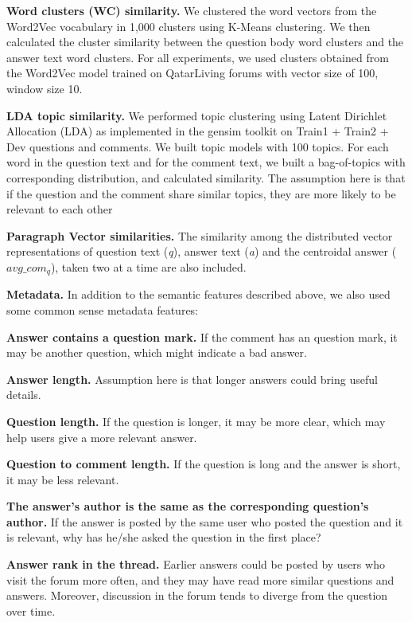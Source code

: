 \documentclass[12pt, a4paper, oneside]{Thesis} %
\begin{document}
\textbf{Word clusters (WC) similarity.} We clustered the word vectors from the Word2Vec vocabulary in 1,000 clusters using K-Means clustering. We then calculated the cluster similarity between the question body word clusters and the answer text word clusters. For all experiments, we used clusters obtained from the Word2Vec model trained on QatarLiving forums with vector size of 100, window size 10.

\textbf{LDA topic similarity.} We performed topic clustering using Latent Dirichlet Allocation (LDA) as implemented in the gensim toolkit \cite{rehurek2010software} on Train1 + Train2 + Dev questions and comments. We built topic models with 100 topics. For each word in the question text and for the comment text, we built a bag-of-topics with corresponding distribution, and calculated similarity. The assumption here is that if the question and the comment share similar topics, they are more likely to be relevant to each other

\textbf{Paragraph Vector similarities.} The similarity among the distributed vector representations of question text (\textit{q}), answer text (\textit{a}) and the centroidal answer ($avg\_com_q$), taken two at a time are also included.

\textbf{Metadata.} In addition to the semantic features described above, we also used some common sense metadata features:

\textbf{Answer contains a question mark.} If the comment has an question mark, it may be another question, which might indicate a bad answer.

\textbf{Answer length.} Assumption here is that longer answers could bring useful details.

\textbf{Question length.} If the question is longer, it may be more clear, which may help users give a more relevant answer.

\textbf{Question to comment length.} If the question is long and the answer is short, it may be less relevant.

\textbf{The answer’s author is the same as the corresponding question’s author.} If the answer is posted by the same user who posted the question and it is relevant, why has he/she asked the question in the first place?

\textbf{Answer rank in the thread.} Earlier answers could be posted by users who visit the forum more often, and they may have read more similar questions and answers. Moreover, discussion in the forum tends to diverge from the question over time.
\end{document}
